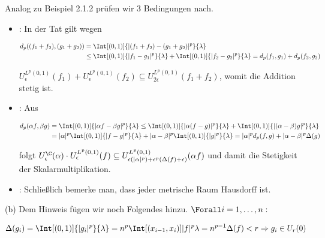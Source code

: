 \begin{solution}
\begin{enumerate}[label = (\roman*)]
\end{enumerate}

Analog zu Beispiel 2.1.2 prüfen wir 3 Bedingungen nach.

\begin{itemize}

  \item
  :
  In der Tat gilt wegen

  \begin{align*}
    d_p((f_1 + f_2), (g_1 + g_2))
    & =
    \Int[(0, 1)]{|(f_1 + f_2) - (g_1 + g_2)|^p}{\lambda} \\
    & \leq
    \Int[(0, 1)]{|f_1  - g_1|^p}{\lambda} +
    \Int[(0, 1)]{|f_2  - g_2|^p}{\lambda}
    =
    d_p(f_1, g_1) + d_p(f_2, g_2)
  \end{align*}

  $U_\epsilon^{L^p(0, 1)}(f_1) + U_\epsilon^{L^p(0, 1)}(f_2) \subseteq U_{2 \epsilon}^{L^p(0, 1)}(f_1 + f_2)$, womit die Addition stetig ist.

  \item
  :
  Aus

  \begin{align*}
    d_p(\alpha f, \beta g)
    & =
    \Int[(0, 1)]{|\alpha f - \beta g|^p}{\lambda}
    \leq
    \Int[(0, 1)]{|\alpha (f - g)|^p}{\lambda} +
    \Int[(0, 1)]{|(\alpha - \beta) g|^p}{\lambda} \\
    & =
    |\alpha|^p
    \Int[(0, 1)]{|f - g|^p}{\lambda} +
    |\alpha - \beta|^p
    \Int[(0, 1)]{|g|^p}{\lambda}
    =
    |\alpha|^p
    d_p(f, g) +
    |\alpha - \beta|^p
    \Delta(g)
  \end{align*}

  folgt $U_\epsilon^\C(\alpha) \cdot U_\epsilon^{L^p(0, 1)}(f) \subseteq U_{\epsilon (|\alpha|^p) + \epsilon^p (\Delta(f) + \epsilon)}^{L^p(0, 1)}(\alpha f)$ und damit die Stetigkeit der Skalarmultiplikation.

  \item
  :
  Schließlich bemerke man, dass jeder metrische Raum Hausdorff ist.

\end{itemize}

(b)
Dem Hinweis fügen wir noch Folgendes hinzu. $\Forall i = 1, \ldots, n:$

\begin{align*}
  \Delta(g_i)
  =
  \Int[(0, 1)]{|g_i|^p}{\lambda}
  =
  n^p
  \Int[(x_{i-1}, x_i)]{|f|^p}{\lambda}
  =
  n^{p-1} \Delta(f) < r
  \Rightarrow
  g_i \in U_r(0)
\end{align*}


\end{solution}
